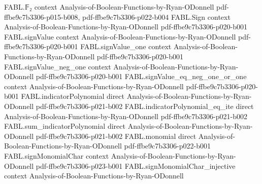 \begin{theorem}
\label{FABL.exists_two_div_pi_near_constant}
\leanok
{}
\proofstep
  {FABL.𝔽₂}
  {context}
  {Analysis-of-Boolean-Functions-by-Ryan-ODonnell}
  {pdf-ffbe9c7b3306-p015-b008,
    pdf-ffbe9c7b3306-p022-b004}
\proofstep
  {FABL.Sign}
  {context}
  {Analysis-of-Boolean-Functions-by-Ryan-ODonnell}
  {pdf-ffbe9c7b3306-p020-b001}
\proofstep
  {FABL.signValue}
  {context}
  {Analysis-of-Boolean-Functions-by-Ryan-ODonnell}
  {pdf-ffbe9c7b3306-p020-b001}
\proofstep
  {FABL.signValue_one}
  {context}
  {Analysis-of-Boolean-Functions-by-Ryan-ODonnell}
  {pdf-ffbe9c7b3306-p020-b001}
\proofstep
  {FABL.signValue_neg_one}
  {context}
  {Analysis-of-Boolean-Functions-by-Ryan-ODonnell}
  {pdf-ffbe9c7b3306-p020-b001}
\proofstep
  {FABL.signValue_eq_neg_one_or_one}
  {context}
  {Analysis-of-Boolean-Functions-by-Ryan-ODonnell}
  {pdf-ffbe9c7b3306-p020-b001}
\proofstep
  {FABL.indicatorPolynomial}
  {direct}
  {Analysis-of-Boolean-Functions-by-Ryan-ODonnell}
  {pdf-ffbe9c7b3306-p021-b002}
\proofstep
  {FABL.indicatorPolynomial_eq_ite}
  {direct}
  {Analysis-of-Boolean-Functions-by-Ryan-ODonnell}
  {pdf-ffbe9c7b3306-p021-b002}
\proofstep
  {FABL.sum_indicatorPolynomial}
  {direct}
  {Analysis-of-Boolean-Functions-by-Ryan-ODonnell}
  {pdf-ffbe9c7b3306-p021-b002}
\proofstep
  {FABL.monomial}
  {direct}
  {Analysis-of-Boolean-Functions-by-Ryan-ODonnell}
  {pdf-ffbe9c7b3306-p022-b001}
\proofstep
  {FABL.signMonomialChar}
  {context}
  {Analysis-of-Boolean-Functions-by-Ryan-ODonnell}
  {pdf-ffbe9c7b3306-p023-b001}
\proofstep
  {FABL.signMonomialChar_injective}
  {context}
  {Analysis-of-Boolean-Functions-by-Ryan-ODonnell}

\end{theorem}

